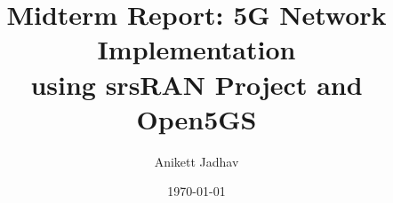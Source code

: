 \documentclass[12pt]{article}
\title{Midterm Report: 5G Network Implementation\\using srsRAN Project and Open5GS}
\author{Anikett Jadhav}
\date{\today}
\begin{document}
\maketitle
\tableofcontents
\newpage





\nocite{*}



\end{document}

